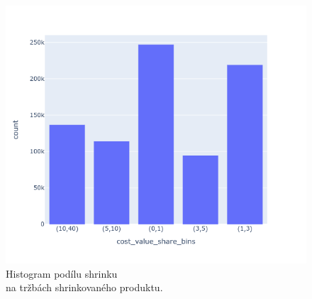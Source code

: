 \begin{figure}[h!]
\end{figure}


\begin{figure}[h!]
    \centering
    \begin{minipage}[b]{.55\textwidth}
      \centering
      \captionsetup{justification=centering}

      \includegraphics[width=\textwidth]{obrazky/grafy/histogram/newplot.png}
      \vspace*{-3em}
      \caption{Histogram podílu shrinku \\na tržbách shrinkovaného produktu.}
      \label{obr:nb:hist3}
    \end{minipage}%
    \hspace*{-2em}
    \begin{minipage}[b]{.55\textwidth}
        \centering
        \captionsetup{justification=centering}
  

\end{minipage}
\end{figure}
